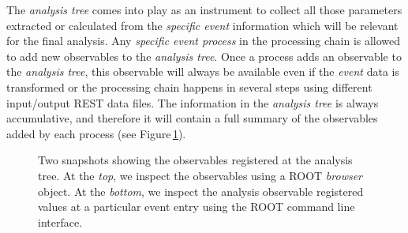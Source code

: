 The \emph{analysis tree} comes into play as an instrument to collect all those parameters extracted or calculated from the \emph{specific event} information which will be relevant for the final analysis.  Any \emph{specific event process} in the processing chain is allowed to add new observables to the \emph{analysis tree}. Once a process adds an observable to the \emph{analysis tree}, this observable will always be available even if the \emph{event} data is transformed or the processing chain happens in several steps using different input/output REST data files. The information in the \emph{analysis tree} is always accumulative, and therefore it will contain a full summary of the observables added by each process (see Figure\,\ref{fig:observables}).


\begin{figure}[tb]
  \centering
	\caption{Two snapshots showing the observables registered at the analysis tree. At the \emph{top}, we inspect the observables using a ROOT \emph{browser} object. At the \emph{bottom}, we inspect the analysis observable registered values at a particular event entry using the ROOT command line interface.}\label{fig:observables}
\end{figure}

